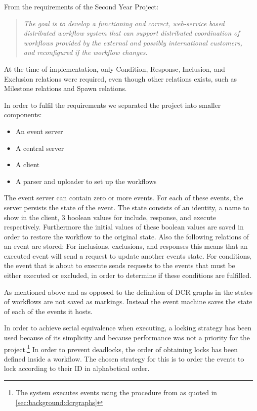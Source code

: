 		\newpar From the requirements of the Second Year Project:
		
		\begin{quotation}
			\noindent\textit{The goal is to develop a functioning and correct, web-service based distributed workflow system that can support distributed coordination of workflows provided by the external and possibly international customers, and reconfigured if the workflow changes.}
		\end{quotation}
		
		\newpar At the time of implementation, only Condition, Response, Inclusion, and Exclusion relations were required, even though other relations exists, such as Milestone relations and Spawn relations. 
		
		\newpar In order to fulfil the requirements we separated the project into smaller components:
		
		\begin{itemize}
			\item An event server
			\item A central server
			\item A client
			\item A parser and uploader to set up the workflows
		\end{itemize}
		
		\newpar The event server can contain zero or more events. For each of these events, the server persists the state of the event. The state consists of an identity, a name to show in the client, 3 boolean values for include, response, and execute respectively. Furthermore the initial values of these boolean values are saved in order to restore the workflow to the original state. Also the following relations of an event are stored: For inclusions, exclusions, and responses this means that an executed event will send a request to update another events state. For conditions, the event that is about to execute sends requests to the events that must be either executed or excluded, in order to determine if these conditions are fulfilled.
		
		As mentioned above and as opposed to the definition of DCR graphs in \cite{hildebrandt2011declarative} the states of workflows are not saved as markings. Instead the event machine saves the state of each of the events it hosts.
		
		\newpar In order to achieve serial equivalence when executing, a locking strategy has been used because of its simplicity and because performance was not a priority for the project.\footnote{The system executes events using the procedure from \cite{debois2015concurrency} as quoted in \autoref{sec:background:dcrgraphs}} In order to prevent deadlocks, the order of obtaining locks has been defined inside a workflow. The chosen strategy for this is to order the events to lock according to their ID in alphabetical order.
		
